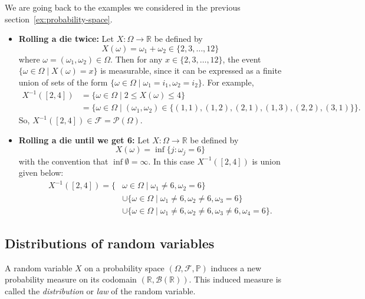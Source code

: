 \begin{example}{\label{ex:random-variable}}
    We are going back to the examples we considered in the previous section~\ref{ex:probability-space}.
    \begin{itemize}
        \item \textbf{Rolling a die twice:} Let $X: \Omega \to \mathbb{R}$ be defined by
        \[
            X(\omega) = \omega_1 + \omega_2 \in \{2, 3, \dots, 12\}
        \]
        where $\omega = (\omega_1, \omega_2) \in \Omega$.
        Then for any $x \in \{2, 3, \dots, 12\}$, the event $\{\omega \in \Omega \mid X(\omega) = x\}$ is measurable, since it can be expressed as a finite union of sets of the form $\{\omega \in \Omega \mid \omega_1 = i_1, \omega_2 = i_2\}$. For example,
        \[
            \begin{aligned}
                X^{-1}([2, 4]) &= \{\omega \in \Omega \mid 2 \leq X(\omega) \leq 4\} \\
                &= \{\omega \in \Omega \mid (\omega_1, \omega_2) \in \{(1, 1), (1, 2), (2, 1), (1, 3), (2, 2), (3, 1)\}\}.
            \end{aligned}
        \]
        So, $X^{-1}([2, 4]) \in \mathcal{F} = \mathcal{P}(\Omega)$.
        \item \textbf{Rolling a die until we get 6:} Let $X: \Omega \to \mathbb{R}$ be defined by
        \[
            X(\omega) = \inf\{j: \omega_j = 6\}
        \]
        with the convention that $\inf{\emptyset} = \infty$. In this case $X^{-1}([2, 4])$ is union given below:
        \[
            \begin{aligned}
                X^{-1}([2, 4]) = \{&\omega \in \Omega \mid \omega_1 \neq 6, \omega_2 = 6\} \\
                &\cup \{\omega \in \Omega \mid \omega_1 \neq 6, \omega_2 \neq 6, \omega_3 = 6\} \\
                &\cup \{\omega \in \Omega \mid \omega_1 \neq 6, \omega_2 \neq 6, \omega_3 \neq 6, \omega_4 = 6\}.

            \end{aligned}
        \]
    \end{itemize}
\end{example}

\subsection{Distributions of random variables}

A random variable $X$ on a probability space $(\Omega, \mathcal{F}, \mathbb{P})$ induces a new probability measure on its codomain $(\mathbb{R}, \mathcal{B}(\mathbb{R}))$. This induced measure is called the \emph{distribution} or \emph{law} of the random variable.

